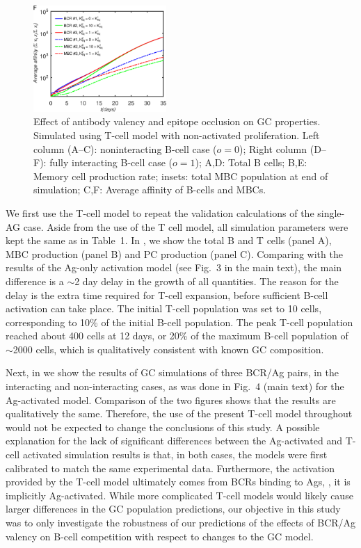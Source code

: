 \begin{figure}
\includegraphics[width=0.45\textwidth]{../figS13def/A.eps}
\caption{Effect of antibody valency and epitope occlusion on GC properties.
Simulated using T-cell model with non-activated proliferation.
Left column (A--C): noninteracting B-cell case ($o=0$);
Right column (D--F): fully interacting B-cell case ($o=1$);
A,D: Total B cells;
B,E: Memory cell production rate; insets: total MBC population at end of simulation;
C,F: Average affinity of B-cells and MBCs.
}
\label{fig:tcavidity}
\end{figure}

We first use the T-cell model to repeat the validation calculations of
the single-AG case. Aside from the use of the T cell model, all
simulation parameters were kept the same as in Table~1.
In , we show the total B and T cells (panel A), MBC production (panel B)
and PC production (panel C). Comparing with the results of the Ag-only activation model
(see Fig.~3 in the main text), the main difference is a $\sim$2 day delay in
the growth of all quantities. The reason for the delay is the extra time
required for T-cell expansion, before sufficient B-cell activation can take place.
The initial T-cell population was set to
10 cells, corresponding to 10\% of the initial B-cell population. The peak
T-cell population reached about 400 cells at 12 days, or 20\% of the maximum B-cell population of $\sim$2000 cells, which is
qualitatively consistent with known GC composition.\cite{allen07}

Next, in  we show the results of GC simulations of three
BCR/Ag pairs, in the interacting and non-interacting cases, as was done
in Fig.~4 (main text) for the Ag-activated model. Comparison of
the two figures shows that the results are qualitatively the same.
Therefore, the use of the present T-cell model throughout would not be expected to
change the conclusions of this study. A possible explanation for the lack of
significant differences between the Ag-activated and T-cell activated
simulation results is that, in both cases, the models were first calibrated to
match the same experimental data. Furthermore, the activation provided by
the T-cell model ultimately comes from BCRs binding to Ags, \ie, it is
implicitly Ag-activated. While more complicated T-cell models would
likely cause larger differences in the GC population predictions, our
objective in this study was to only investigate the robustness of our
predictions of the effects of BCR/Ag valency on B-cell competition with respect to
changes to the GC model.

